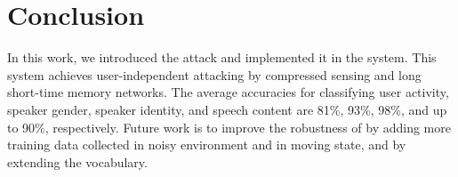 
\section{Conclusion}

In this work, we introduced the {\attackName} attack and implemented it in the {\systemName} system.  This  {\systemName} system achieves user-independent attacking by compressed sensing and long short-time memory networks. The average accuracies for classifying user activity, speaker gender, speaker identity, and speech content are 81\%, 93\%, 98\%, and up to 90\%, respectively. Future work is to improve the robustness of {\systemName} by adding more training data collected in noisy environment and in moving state, and by extending the vocabulary.

\newpage

